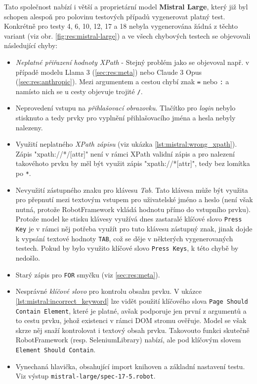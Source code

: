 \documentclass[czech, ma, kiv, he, iso690numb, pdf, viewonly]{fasthesis}
\begin{document}
        \noindent Tato společnost nabízí i větší a proprietární model \textbf{Mistral Large}, který již byl schopen alespoň pro polovinu testových případů vygenerovat platný test. Konkrétně pro testy 4, 6, 10, 12, 17 a 18 nebyla vygenerována žádná z těchto variant (viz obr. \ref{fig:res:mistral-large}) a ve všech chybových testech se objevovali následující chyby:
        \begin{itemize}
            \item \emph{Neplatné přiřazení hodnoty XPath} - Stejný problém jako se objevoval např. v případě modelu Llama 3 (\ref{sec:res:meta}) nebo Claude 3 Opus (\ref{sec:res:anthropic}). Mezi argumentem a cestou chybí znak \verb|=| nebo \verb|:| a namísto nich se u cesty objevuje trojité \verb|/|.
            \item Neprovedení vstupu na \emph{přihlašovací obrazovku}. Tlačítko pro \emph{login} nebylo stisknuto a tedy prvky pro vyplnění přihlašovacího jména a hesla nebyly nalezeny.
            \item Využití neplatného \emph{XPath zápisu} (viz ukázka \ref{lst:mistral:wrong_xpath}). Zápis "xpath://*/[attr]" není v rámci XPath validní zápis a pro nalezení takovéhoto prvku by měl být využit zápis "xpath://*[attr]", tedy bez lomítka po \verb|*|.
            \item Nevyužití zástupného znaku pro klávesu \textit{Tab}. Tato klávesa může být využita pro přepnutí mezi textovým vstupem pro uživatelské jméno a heslo (není však nutná, protože RobotFramework vkládá hodnotu přímo do vstupního prvku). Protože model ke stisku klávesy využívá dnes zastaralé klíčové slovo \verb|Press Key| je v rámci něj potřeba využít pro tuto klávesu zástupný znak, jinak dojde k vypsání textové hodnoty \verb|TAB|, což se děje v některých vygenerovaných testech. Pokud by bylo využito klíčové slovo \verb|Press Keys|, k této chybě by nedošlo.
            \item Starý zápis pro \verb|FOR| smyčku (viz \ref{sec:res:meta}).
            \item Nesprávné \emph{klíčové slovo} pro kontrolu obsahu prvku. V ukázce \ref{lst:mistral:incorrect_keyword} lze vidět použití klíčového slova \verb|Page Should Contain Element|, které je platné, avšak podporuje jen první z argumentů a to cestu prvku, jehož existenci v rámci DOM stromu ověřuje. Model se však skrze něj snaží kontrolovat i textový obsah prvku. Takovouto funkci skutečně RobotFramework (resp. SeleniumLibrary) nabízí, ale pod klíčovým slovem \verb|Element Should Contain|.
            \item Vynechaná hlavička, obsahující import knihoven a základní nastavení testu. Viz výstup \verb|mistral-large/spec-17-5.robot|.
        \end{itemize}
\end{document}
